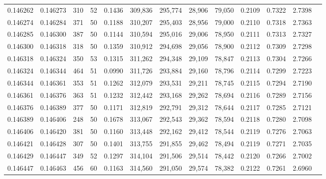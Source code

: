 \begin{tabular}{rrrrrrrrrrrrr}
0.146262 & 0.146273 &   310 &  52 &                                     0.1436 & 309,836 & 295,774 &  28,906 &  79,050 & 0.2109 & 0.7322 & 2.7398 \\
0.146274 & 0.146284 &   371 &  50 &                                     0.1188 & 310,207 & 295,403 &  28,956 &  79,000 & 0.2110 & 0.7318 & 2.7363 \\
0.146285 & 0.146300 &   387 &  50 &                                     0.1144 & 310,594 & 295,016 &  29,006 &  78,950 & 0.2111 & 0.7313 & 2.7327 \\
0.146300 & 0.146318 &   318 &  50 &                                     0.1359 & 310,912 & 294,698 &  29,056 &  78,900 & 0.2112 & 0.7309 & 2.7298 \\
0.146318 & 0.146324 &   350 &  53 &                                     0.1315 & 311,262 & 294,348 &  29,109 &  78,847 & 0.2113 & 0.7304 & 2.7266 \\
0.146324 & 0.146344 &   464 &  51 &                                     0.0990 & 311,726 & 293,884 &  29,160 &  78,796 & 0.2114 & 0.7299 & 2.7223 \\
0.146344 & 0.146361 &   353 &  51 &                                     0.1262 & 312,079 & 293,531 &  29,211 &  78,745 & 0.2115 & 0.7294 & 2.7190 \\
0.146361 & 0.146376 &   363 &  51 &                                     0.1232 & 312,442 & 293,168 &  29,262 &  78,694 & 0.2116 & 0.7289 & 2.7156 \\
0.146376 & 0.146389 &   377 &  50 &                                     0.1171 & 312,819 & 292,791 &  29,312 &  78,644 & 0.2117 & 0.7285 & 2.7121 \\
0.146389 & 0.146406 &   248 &  50 &                                     0.1678 & 313,067 & 292,543 &  29,362 &  78,594 & 0.2118 & 0.7280 & 2.7098 \\
0.146406 & 0.146420 &   381 &  50 &                                     0.1160 & 313,448 & 292,162 &  29,412 &  78,544 & 0.2119 & 0.7276 & 2.7063 \\
0.146421 & 0.146428 &   307 &  50 &                                     0.1401 & 313,755 & 291,855 &  29,462 &  78,494 & 0.2119 & 0.7271 & 2.7035 \\
0.146429 & 0.146447 &   349 &  52 &                                     0.1297 & 314,104 & 291,506 &  29,514 &  78,442 & 0.2120 & 0.7266 & 2.7002 \\
0.146447 & 0.146463 &   456 &  60 &                                     0.1163 & 314,560 & 291,050 &  29,574 &  78,382 & 0.2122 & 0.7261 & 2.6960 \\

\end{tabular}
